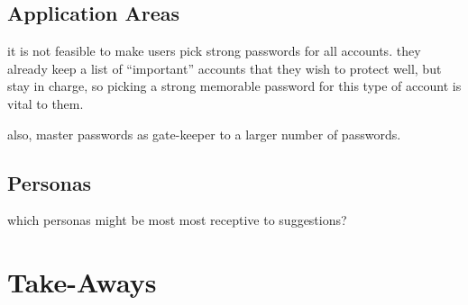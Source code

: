 \subsection{Application Areas}
it is not feasible to make users pick strong passwords for all accounts.
they already keep a list of ``important'' accounts that they wish to protect well, but stay in charge, so picking a strong memorable password for this type of account is vital to them. 

also, master passwords as gate-keeper to a larger number of passwords. 

\subsection{Personas}
which personas might be most most receptive to suggestions?

\section{Take-Aways}




